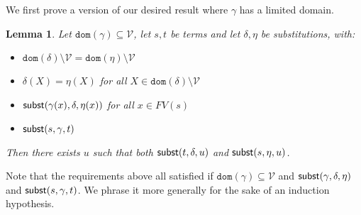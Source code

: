 \documentclass{lmcs}
\theoremstyle{theorem}\newtheorem{theorem}{Theorem}
\theoremstyle{theorem}\newtheorem{lemma}[theorem]{Lemma}
\theoremstyle{theorem}\newtheorem{corollary}[theorem]{Corollary}
\theoremstyle{definition}\newtheorem{definition}[theorem]{Definition}
\theoremstyle{definition}\newtheorem{example}[theorem]{Example}
\newcommand{\V}{\mathcal{V}}
\newcommand{\FV}{\mathit{FV}}
\newcommand{\domain}{\mathtt{dom}}
\newcommand{\avar}{x}
\newcommand{\Avar}{X}
\begin{document}
We first prove a version of our desired result where $\gamma$ has a limited
domain.

\begin{lemma}\label{lem:combinesubst:allbound}
Let $\domain(\gamma) \subseteq \V$, let $s,t$ be terms and let
$\delta,\eta$ be substitutions, with:
\begin{itemize}
\item $\domain(\delta) \setminus \V = \domain(\eta) \setminus \V$
\item $\delta(\Avar) = \eta(\Avar)$ for all $\Avar \in \domain(\delta) \setminus
  \V$
\item $\subrel{\gamma(\avar),\delta,\eta(\avar)}$ for all $\avar \in \FV(s)$
\item $\mathsf{subst}(s,\gamma,t)$
\end{itemize}
Then there exists $u$ such that both $\mathsf{subst}(t,\delta,u)$ and
$\mathsf{subst}(s,\eta,u)$.
\end{lemma}

Note that the requirements above all satisfied if $\domain(\gamma) \subseteq \V$
and $\mathsf{subst}(\gamma,\delta,\eta)$ and $\mathsf{subst}(s,\gamma,t)$.  We phrase it more
generally for the sake of an induction hypothesis.
\end{document}
